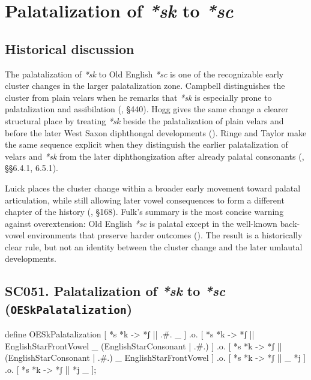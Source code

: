 \documentclass[
  british,
  a4paper,
  openany]{book}
\providecommand{\texorpdfstring}[2]{#1}
\begin{document}
\section{\texorpdfstring{Palatalization of \emph{*sk} to
\emph{*sc}}{Palatalization of  to }}\label{palatalization-of-to}

\subsection{Historical discussion}\label{historical-discussion-27}

The palatalization of \emph{*sk} to Old English \emph{*sc} is one of the
recognizable early cluster changes in the larger palatalization zone.
Campbell distinguishes the cluster from plain velars when he remarks
that \emph{*sk} is especially prone to palatalization and assibilation
(, §440). Hogg gives the
same change a clearer structural place by treating \emph{*sk} beside the
palatalization of plain velars and before the later West Saxon
diphthongal developments (). Ringe and Taylor make the same sequence explicit when they
distinguish the earlier palatalization of velars and \emph{*sk} from the
later diphthongization after already palatal consonants
(,
§§6.4.1, 6.5.1).

Luick places the cluster change within a broader early movement toward
palatal articulation, while still allowing later vowel consequences to
form a different chapter of the history (, §168). Fulk's summary is the most concise warning
against overextension: Old English \emph{*sc} is palatal except in the
well-known back-vowel environments that preserve harder outcomes
(). The result is a historically
clear rule, but not an identity between the cluster change and the later
umlautal developments.

\subsection{\texorpdfstring{SC051. Palatalization of \emph{*sk} to
\emph{*sc}
(\texttt{OESkPalatalization})}{SC051. Palatalization of  to  (OESkPalatalization)}}\label{rule-OESkPalatalization}

\begin{ReaderFacingFoma}
define OESkPalatalization [
    {*s} {*k} -> {*ʃ} || .#. _
] .o. [
    {*s} {*k} -> {*ʃ} || EnglishStarFrontVowel _ (EnglishStarConsonant | .#.)
] .o. [
    {*s} {*k} -> {*ʃ} || (EnglishStarConsonant | .#.) _ EnglishStarFrontVowel
] .o. [
    {*s} {*k} -> {*ʃ} || _ {*j}
] .o. [
    {*s} {*k} -> {*ʃ} || {*j} _
];
\end{ReaderFacingFoma}
\end{document}

